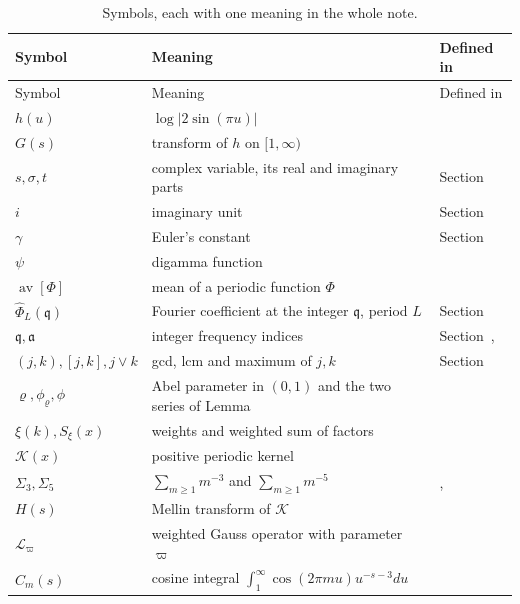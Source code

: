 \documentclass[11pt,reqno]{amsart}
\makeatletter
\let\CG@origref\ref
\let\CG@origeqref\eqref
\newcommand{\CG@gettip}[1]{\@ifundefined{CGTip@#1}{Reference: #1}{\csname CGTip@#1\endcsname}}
\DeclareRobustCommand{\CGref}[1]{\pdftooltip{\CG@origref{#1}}{\CG@gettip{#1}}}
\DeclareRobustCommand{\CGeqref}[1]{\pdftooltip{\CG@origeqref{#1}}{\CG@gettip{#1}}}
\numberwithin{equation}{section}
\theoremstyle{plain}
\theoremstyle{definition}
\theoremstyle{remark}
\makeatother
\begin{document}
\begin{longtable}{>{\raggedright\arraybackslash}p{}>{\raggedright\arraybackslash}p{}>{\raggedright\arraybackslash}p{}}
\caption{Symbols, each with one meaning in the whole note.}\label{tab:symbols}\\
\toprule
Symbol & Meaning & Defined in\\
\midrule
\endfirsthead
\toprule
Symbol & Meaning & Defined in\\
\midrule
\endhead
\bottomrule
\endfoot
$h(u)$ & $\log|2\sin(\pi u)|$ & \CGeqref{eq:h}\\
$G(s)$ & transform of $h$ on $[1,\infty)$ & \CGeqref{eq:G}\\
$s,\sigma,t$ & complex variable, its real and imaginary parts & Section~\CGref{sec:notation}\\
$i$ & imaginary unit & Section~\CGref{sec:notation}\\
$\gamma$ & Euler's constant & Section~\CGref{sec:notation}\\
$\psi$ & digamma function & \CGeqref{eq:psi}\\
$\operatorname{av}[\Phi]$ & mean of a periodic function $\Phi$ & \CGeqref{eq:av}\\
$\widehat\Phi_L(\mathfrak q)$ & Fourier coefficient at the integer $\mathfrak q$, period $L$ & Section~\CGref{sec:notation}\\
$\mathfrak q,\mathfrak a$ & integer frequency indices & Section~\CGref{sec:notation}, \CGeqref{eq:conv}\\
$(j,k),[j,k],j\vee k$ & gcd, lcm and maximum of $j,k$ & Section~\CGref{sec:notation}\\
$\varrho,\phi_\varrho,\phi$ & Abel parameter in $(0,1)$ and the two series of Lemma~\CGref{lem:kernel} & \CGeqref{eq:abel}\\
$\xi(k),S_\xi(x)$ & weights and weighted sum of factors & \CGeqref{eq:Sxi}\\
$\mathcal K(x)$ & positive periodic kernel & \CGeqref{eq:K}\\
$\Sigma_3,\Sigma_5$ & $\sum_{m\ge1}m^{-3}$ and $\sum_{m\ge1}m^{-5}$ & \CGeqref{eq:K}, \CGeqref{eq:special}\\
$H(s)$ & Mellin transform of $\mathcal K$ & \CGeqref{eq:H}\\
$\mathcal L_\varpi$ & weighted Gauss operator with parameter $\varpi$ & \CGeqref{eq:PF}\\
$C_m(s)$ & cosine integral $\int_1^\infty\cos(2\pi mu)u^{-s-3}du$ & \CGeqref{eq:Hfourier}\\

\end{longtable}
\end{document}
